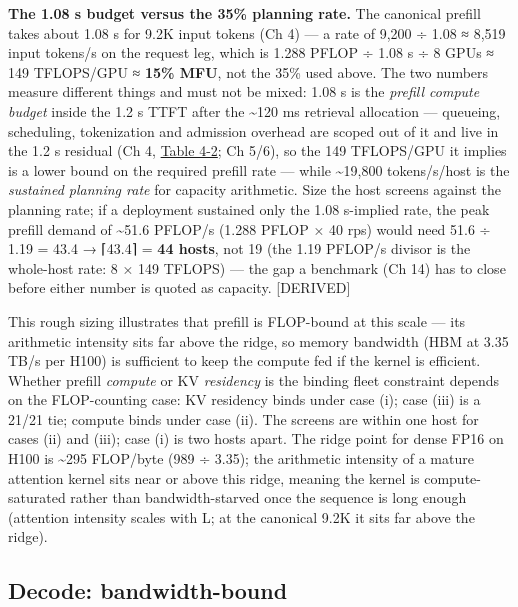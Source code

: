 \textbf{The 1.08 s budget versus the 35\% planning rate.} The canonical
prefill takes about 1.08 s for 9.2K input tokens (Ch 4) --- a rate of
9,200 ÷ 1.08 ≈ 8,519 input tokens/s on the request leg, which is 1.288
PFLOP ÷ 1.08 s ÷ 8 GPUs ≈ 149 TFLOPS/GPU ≈ \textbf{15\% MFU}, not the
35\% used above. The two numbers measure different things and must not
be mixed: 1.08 s is the \emph{prefill compute budget} inside the 1.2 s
TTFT after the \textasciitilde120 ms retrieval allocation --- queueing,
scheduling, tokenization and admission overhead are scoped out of it and
live in the 1.2 s residual (Ch 4, \hyperref[tab:4.2]{Table 4-2}; Ch 5/6), so the 149
TFLOPS/GPU it implies is a lower bound on the required prefill rate ---
while \textasciitilde19,800 tokens/s/host is the \emph{sustained
planning rate} for capacity arithmetic. Size the host screens against
the planning rate; if a deployment sustained only the 1.08 s-implied
rate, the peak prefill demand of \textasciitilde51.6 PFLOP/s (1.288
PFLOP × 40 rps) would need 51.6 ÷ 1.19 = 43.4 → ⌈43.4⌉ = \textbf{44
hosts}, not 19 (the 1.19 PFLOP/s divisor is the whole-host rate: 8 × 149
TFLOPS) --- the gap a benchmark (Ch 14) has to close before either
number is quoted as capacity. \mbox{{[}DERIVED{]}}

This rough sizing illustrates that prefill is FLOP-bound at this scale
--- its arithmetic intensity sits far above the ridge, so memory
bandwidth (HBM at 3.35 TB/s per H100) is sufficient to keep the compute
fed if the kernel is efficient. Whether prefill \emph{compute} or KV
\emph{residency} is the binding fleet constraint depends on the
FLOP-counting case: KV residency binds under case (i); case (iii) is a
21/21 tie; compute binds under case (ii). The screens are within one
host for cases (ii) and (iii); case (i) is two hosts apart. The ridge
point for dense FP16 on H100 is \textasciitilde295 FLOP/byte (989 ÷
3.35); the arithmetic intensity of a mature attention kernel sits near
or above this ridge, meaning the kernel is compute-saturated rather than
bandwidth-starved once the sequence is long enough (attention intensity
scales with L; at the canonical 9.2K it sits far above the ridge).

\subsection{Decode: bandwidth-bound}\label{decode-bandwidth-bound}

